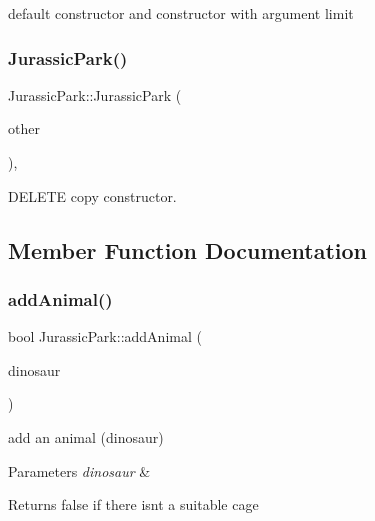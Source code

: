 default constructor and constructor with argument limit 

\mbox{\label{classJurassicPark_a8d267bb3de6c8047b3502167c6889ab3}} 
\subsubsection{\texorpdfstring{Jurassic\+Park()}{JurassicPark()}\hspace{0.1cm}{\footnotesize\ttfamily [2/2]}}
{\footnotesize\ttfamily Jurassic\+Park\+::\+Jurassic\+Park (\begin{DoxyParamCaption}\item[{const \hyperlink{classJurassicPark}{Jurassic\+Park} \&}]{other }\end{DoxyParamCaption})\hspace{0.3cm}{\ttfamily [private]}, {\ttfamily [delete]}}



D\+E\+L\+E\+TE copy constructor. 



\subsection{Member Function Documentation}
\mbox{\label{classJurassicPark_a6301a06db0d3c61b8823ed99585903f7}} 
\subsubsection{\texorpdfstring{add\+Animal()}{addAnimal()}}
{\footnotesize\ttfamily bool Jurassic\+Park\+::add\+Animal (\begin{DoxyParamCaption}\item[{const \hyperlink{classDinosaur}{Dinosaur} \&}]{dinosaur }\end{DoxyParamCaption})}

add an animal (dinosaur) 
\begin{DoxyParams}{Parameters}
{\em dinosaur} & \\
\hline
\end{DoxyParams}
\begin{DoxyReturn}{Returns}
false if there isn\textquotesingle{}t a suitable cage 
\end{DoxyReturn}
\mbox{\label{classJurassicPark_a56eb91d1acfcf61925b9fe599d878b05}} 
